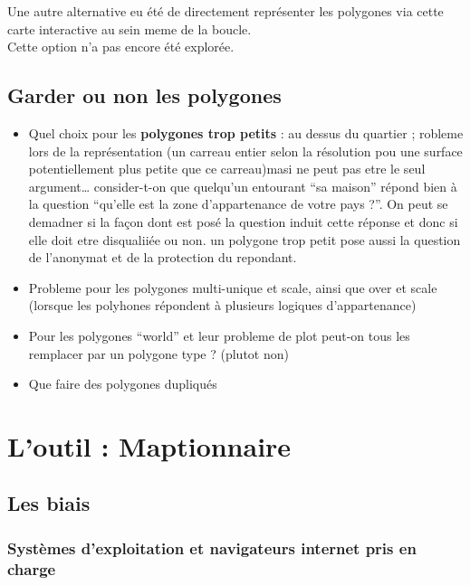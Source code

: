 \documentclass[
  12pt,
  a4paperpaper,
]{book}
\begin{document}
Une autre alternative eu été de directement représenter les polygones
via cette carte interactive au sein meme de la boucle.\\
Cette option n'a pas encore été explorée.

\hypertarget{garder-ou-non-les-polygones}{%
\subsection{Garder ou non les
polygones}\label{garder-ou-non-les-polygones}}

\begin{itemize}
\item
  Quel choix pour les \textbf{polygones trop petits} : au dessus du
  quartier ; robleme lors de la représentation (un carreau entier selon
  la résolution pou une surface potentiellement plus petite que ce
  carreau)masi ne peut pas etre le seul argument\ldots{} consider-t-on
  que quelqu'un entourant ``sa maison'' répond bien à la question
  ``qu'elle est la zone d'appartenance de votre pays ?''. On peut se
  demadner si la façon dont est posé la question induit cette réponse et
  donc si elle doit etre disqualiiée ou non. un polygone trop petit pose
  aussi la question de l'anonymat et de la protection du repondant.
\item
  Probleme pour les polygones multi-unique et scale, ainsi que over et
  scale (lorsque les polyhones répondent à plusieurs logiques
  d'appartenance)
\item
  Pour les polygones ``world'' et leur probleme de plot peut-on tous les
  remplacer par un polygone type ? (plutot non)
\item
  Que faire des polygones dupliqués
\end{itemize}

\hypertarget{loutil-maptionnaire}{%
\section{L'outil : Maptionnaire}\label{loutil-maptionnaire}}

\hypertarget{les-biais}{%
\subsection{Les biais}\label{les-biais}}

\hypertarget{systuxe8mes-dexploitation-et-navigateurs-internet-pris-en-charge}{%
\subsubsection{Systèmes d'exploitation et navigateurs internet pris en
charge}\label{systuxe8mes-dexploitation-et-navigateurs-internet-pris-en-charge}}
\end{document}
